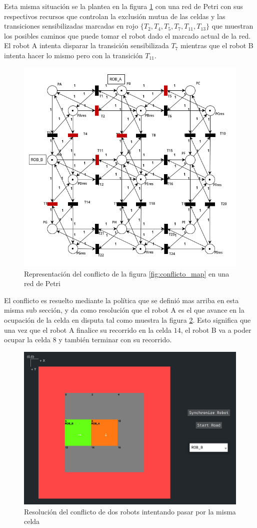 Esta misma situación se la plantea en la figura \ref{fig:rdp_no_grid_conflicto} con una red de Petri con sus respectivos recursos que controlan la exclusión mutua de las celdas y las transiciones sensibilizadas marcadas en rojo $\{T_2, T_4, T_5, T_7, T_{11}, T_{13}\}$ que muestran los posibles caminos que puede tomar el robot dado el marcado actual de la red. El robot A intenta disparar la transición sensibilizada $T_7$ mientras que el robot B intenta hacer lo mismo pero con la transición $T_{11}$.

\begin{figure}[H]
    \centering
    \includegraphics[width=0.6\linewidth]{images/rdp_no_grid_conflicto.png}
    \caption{Representación del conflicto de la figura \ref{fig:conflicto_map} en una red de Petri}
    \label{fig:rdp_no_grid_conflicto}
\end{figure}

El conflicto es resuelto mediante la política que se definió mas arriba en esta misma sub sección, y da como resolución que el robot A es el que avance en la ocupación de la celda en disputa tal como muestra la figura \ref{fig:conflicto_map_solucionado}. Esto significa que una vez que el robot A finalice su recorrido en la celda $14$, el robot B va a poder ocupar la celda $8$ y también terminar con su recorrido.

\begin{figure}[H]
    \centering
    \includegraphics[trim={1.6cm 0.3cm 0 1.5cm}, clip, width=0.7\linewidth]{images/conflicto_map_solucionado.png}
    \caption{Resolución del conflicto de dos robots intentando pasar por la misma celda}
    \label{fig:conflicto_map_solucionado}
\end{figure}

